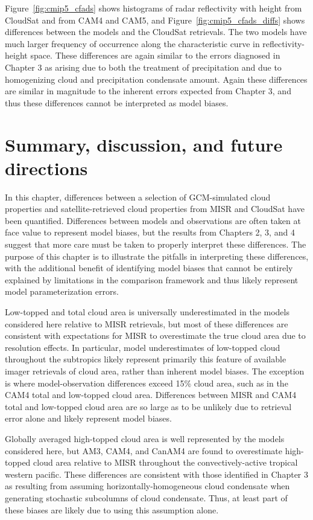 Figure~\ref{fig:cmip5_cfads} shows histograms of radar reflectivity with
height from CloudSat and from CAM4 and CAM5, and
Figure~\ref{fig:cmip5_cfads_diffs} shows differences between the models
and the CloudSat retrievals. The two models have much larger frequency
of occurrence along the characteristic curve in reflectivity-height
space. These differences are again similar to the errors diagnosed in
Chapter 3 as arising due to both the treatment of precipitation and due
to homogenizing cloud and precipitation condensate amount. Again these
differences are similar in magnitude to the inherent errors expected
from Chapter 3, and thus these differences cannot be interpreted as
model biases.

\section{Summary, discussion, and future
directions}\label{summary-discussion-and-future-directions}

In this chapter, differences between a selection of GCM-simulated cloud
properties and satellite-retrieved cloud properties from MISR and
CloudSat have been quantified. Differences between models and
observations are often taken at face value to represent model biases,
but the results from Chapters 2, 3, and 4 suggest that more care must be
taken to properly interpret these differences. The purpose of this
chapter is to illustrate the pitfalls in interpreting these differences,
with the additional benefit of identifying model biases that cannot be
entirely explained by limitations in the comparison framework and thus
likely represent model parameterization errors.

Low-topped and total cloud area is universally underestimated in the
models considered here relative to MISR retrievals, but most of these
differences are consistent with expectations for MISR to overestimate
the true cloud area due to resolution effects. In particular, model
underestimates of low-topped cloud throughout the subtropics likely
represent primarily this feature of available imager retrievals of cloud
area, rather than inherent model biases. The exception is where
model-observation differences exceed 15\% cloud area, such as in the
CAM4 total and low-topped cloud area. Differences between MISR and CAM4
total and low-topped cloud area are so large as to be unlikely due to
retrieval error alone and likely represent model biases.

Globally averaged high-topped cloud area is well represented by the
models considered here, but AM3, CAM4, and CanAM4 are found to
overestimate high-topped cloud area relative to MISR throughout the
convectively-active tropical western pacific. These differences are
consistent with those identified in Chapter 3 as resulting from assuming
horizontally-homogeneous cloud condensate when generating stochastic
subcolumns of cloud condensate. Thus, at least part of these biases are
likely due to using this assumption alone.

